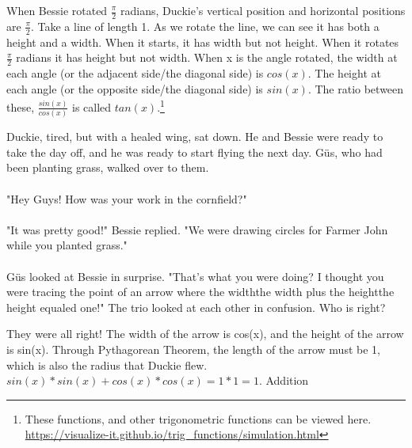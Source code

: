 {When Bessie rotated $\frac{\pi}{2}$ radians, Duckie's vertical position and horizontal positions are $\frac{\pi}{2}$.}
{Take a line of length 1. As we rotate the line, we can see it has both a height and a width. When it starts, it has width but not height. When it rotates $\frac{\pi}{2}$ radians it has height but not width. When x is the angle rotated, the width at each angle (or the adjacent side/the diagonal side) is $cos(x)$. The height at each angle (or the opposite side/the diagonal side) is $sin(x)$. The ratio between these, $\frac{sin(x)}{cos(x)}$ is called $tan(x)$.\footnote{These functions, and other trigonometric functions can be viewed here. \url{https://visualize-it.github.io/trig_functions/simulation.html}}}
{}
{Duckie, tired, but with a healed wing, sat down. He and Bessie were ready to take the day off, and he was ready to start flying the next day. Güs, who had been planting grass, walked over to them. 
\paragraph{} "Hey Guys! How was your work in the cornfield?"
\paragraph{} "It was pretty good!" Bessie replied. "We were drawing circles for Farmer John while you planted grass."
\paragraph{} Güs looked at Bessie in surprise. "That's what you were doing? I thought you were tracing the point of an arrow where the width\texttimes the width plus the height\texttimes the height equaled one!"
The trio looked at each other in confusion. Who is right?}
{They were all right! The width of the arrow is cos(x), and the height of the arrow is sin(x). Through Pythagorean Theorem, the length of the arrow must be 1, which is also the radius that Duckie flew.}
{$sin(x) * sin(x) + cos(x) * cos(x) = 1*1 = 1$.}
{Addition}